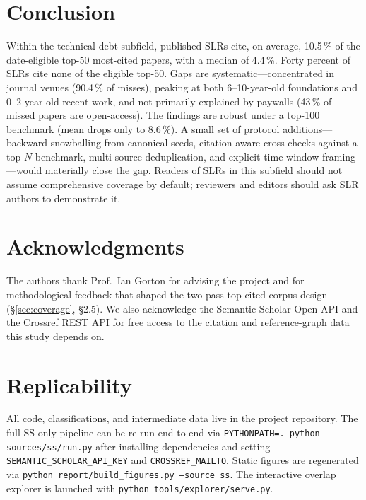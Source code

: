 \documentclass[conference]{IEEEtran}
\begin{document}
\section{Conclusion}

Within the technical-debt subfield, published SLRs cite, on average,
10.5\,\% of the date-eligible top-50 most-cited papers, with a median of
4.4\,\%. Forty percent of SLRs cite none of the eligible top-50. Gaps are
systematic---concentrated in journal venues (90.4\,\% of misses), peaking
at both 6--10-year-old foundations and 0--2-year-old recent work, and not
primarily explained by paywalls (43\,\% of missed papers are open-access).
The findings are robust under a top-100 benchmark (mean drops only to
8.6\,\%). A small set of protocol additions---backward snowballing from
canonical seeds, citation-aware cross-checks against a top-$N$ benchmark,
multi-source deduplication, and explicit time-window framing---would
materially close the gap. Readers of SLRs in this subfield should not
assume comprehensive coverage by default; reviewers and editors should
ask SLR authors to demonstrate it.

\section*{Acknowledgments}

The authors thank Prof.\ Ian Gorton for advising the project and for
methodological feedback that shaped the two-pass top-cited corpus design
(\S\ref{sec:coverage}, \S2.5). We also acknowledge the Semantic Scholar
Open API and the Crossref REST API for free access to the citation and
reference-graph data this study depends on.




\section*{Replicability}

All code, classifications, and intermediate data live in the project
repository. The full SS-only pipeline can be re-run end-to-end via
\texttt{PYTHONPATH=. python sources/ss/run.py} after installing
dependencies and setting \texttt{SEMANTIC\_SCHOLAR\_API\_KEY} and
\texttt{CROSSREF\_MAILTO}. Static figures are regenerated via
\texttt{python report/build\_figures.py --source ss}. The interactive
overlap explorer is launched with \texttt{python tools/explorer/serve.py}.
\end{document}
